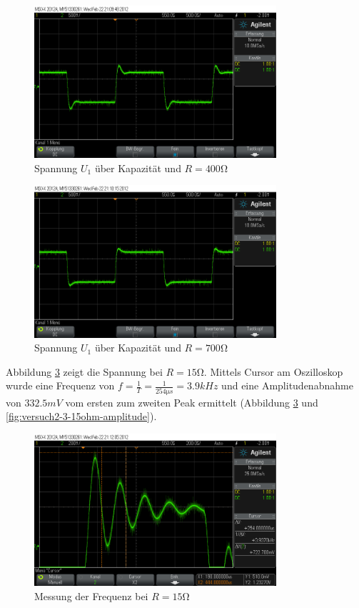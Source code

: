 \documentclass[a4paper]{article}
\begin{document}
\begin{figure}[H]
    \centering
    \includegraphics[width=0.8\textwidth]{versuch2_3_400ohm.png}
    \caption{Spannung $U_1$ über Kapazität und $R=400\si{\ohm}$}
    \label{fig:versuch2-3-400ohm}
\end{figure}

\begin{figure}[H]
    \centering
    \includegraphics[width=0.8\textwidth]{versuch2_3_700ohm.png}
    \caption{Spannung $U_1$ über Kapazität und $R=700\si{\ohm}$}
    \label{fig:versuch2-3-700ohm}
\end{figure}

Abbildung \ref{fig:versuch2-3-15ohm-frequenz} zeigt die Spannung bei $R=15\si{\ohm}$.
Mittels Cursor am Oszilloskop wurde eine Frequenz von $f=\frac{1}{T}=\frac{1}{254\si{\micro s}}=3.9\si{kHz}$ und eine Amplitudenabnahme von $332.5\si{mV}$ vom ersten zum zweiten Peak ermittelt (Abbildung \ref{fig:versuch2-3-15ohm-frequenz} und \ref{fig:versuch2-3-15ohm-amplitude}).

\begin{figure}[H]
    \centering
    \includegraphics[width=0.8\textwidth]{versuch2_3_15ohm_frequenz.png}
    \caption{Messung der Frequenz bei $R=15\si{\ohm}$}
    \label{fig:versuch2-3-15ohm-frequenz}
\end{figure}
\end{document}
